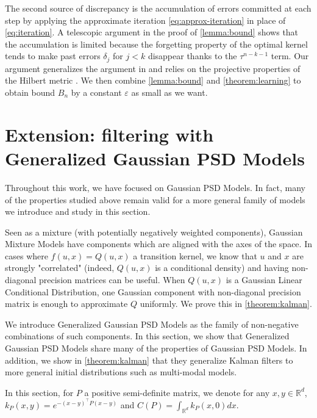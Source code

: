 The second source of discrepancy is the accumulation of errors committed at each step by applying the approximate iteration \cref{eq:approx-iteration} in place of \cref{eq:iteration}. A telescopic argument in the proof of \cref{lemma:bound} shows that the accumulation is limited because the forgetting property of the optimal kernel tends to make past errors $\delta_{j}$ for $j < k$ disappear thanks to the $\tau^{n-k-1}$ term. Our argument generalizes the argument in \cite{oudjane} and relies on the projective properties of the Hilbert metric \citep{cohen}. We then combine \cref{lemma:bound} and \cref{theorem:learning} to obtain bound $B_n$ by a constant $\varepsilon$ as small as we want.


\section{Extension: filtering with Generalized Gaussian PSD Models}\label{sec:generalized-psd-models}
Throughout this work, we have focused on Gaussian PSD Models. In fact, many of the properties studied above remain valid for a more general family of models we introduce and study in this section.

Seen as a mixture (with potentially negatively weighted components), Gaussian Mixture Models have components which are aligned with the axes of the space. In cases where $f(u, x) = Q(u, x)$ a transition kernel, we know that $u$ and $x$ are strongly "correlated" (indeed, $Q(u, x)$ is a conditional density) and having non-diagonal precision matrices can be useful. When $Q(u, x)$ is a Gaussian Linear Conditional Distribution, one Gaussian component with non-diagonal precision matrix is enough to approximate $Q$ uniformly. We prove this in \cref{theorem:kalman}.

We introduce Generalized Gaussian PSD Models as the family of non-negative combinations of such components. In this section, we show that Generalized Gaussian PSD Models share many of the properties of Gaussian PSD Models. In addition, we show in \cref{theorem:kalman} that they generalize Kalman filters to more general initial distributions such as multi-modal models.

In this section, for $P$ a positive semi-definite matrix, we denote for any $x, y\in\mathbb R^d$, $k_P(x, y) = e^{-(x-y)^\top  P(x-y)}$ and $C(P) = \int_{\mathbb R^d} k_P(x, 0)dx$.

